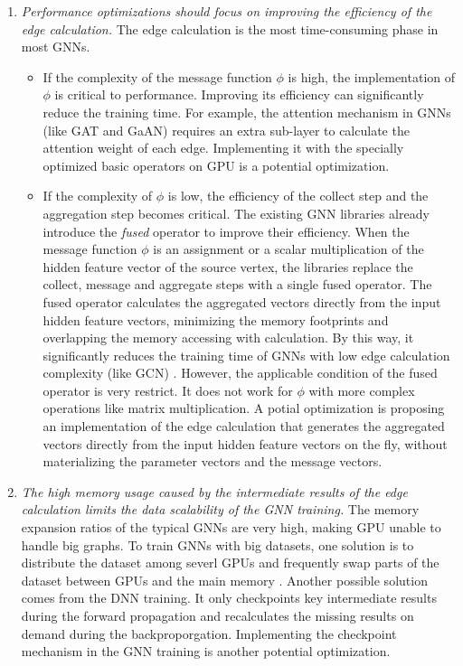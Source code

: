 \begin{enumerate}
    \item \emph{Performance optimizations should focus on improving the efficiency of the edge calculation.}
          The edge calculation is the most time-consuming phase in most GNNs.
          \begin{itemize}
              \item If the complexity of the message function $\phi$ is high, the implementation of $\phi$ is critical to performance.
                    Improving its efficiency can significantly reduce the training time.
                    For example, the attention mechanism in GNNs (like GAT and GaAN) requires an extra sub-layer to calculate the attention weight of each edge.
                    Implementing it with the specially optimized basic operators on GPU is a potential optimization.
              \item If the complexity of $\phi$ is low, the efficiency of the collect step and the aggregation step becomes critical.
                    The existing GNN libraries \cite{DGL, PyG, ma2019_neugraph} already introduce the \emph{fused} operator to improve their efficiency.
                    When the message function $\phi$ is an assignment or a scalar multiplication of the hidden feature vector of the source vertex, the libraries replace the collect, message and aggregate steps with a single fused operator.
                    The fused operator calculates the aggregated vectors directly from the input hidden feature vectors, minimizing the memory footprints and overlapping the memory accessing with calculation.
                    By this way, it significantly reduces the training time of GNNs with low edge calculation complexity (like GCN) \cite{yan2020_characterizing_gcn, zhang2020_analysis_neugraph}.
                    However, the applicable condition of the fused operator is very restrict.
                    It does not work for $\phi$ with more complex operations like matrix multiplication.
                    A potial optimization is proposing an implementation of the edge calculation that generates the aggregated vectors directly from the input hidden feature vectors on the fly, without materializing the parameter vectors and the message vectors.
          \end{itemize}
    \item \emph{The high memory usage caused by the intermediate results of the edge calculation limits the data scalability of the GNN training.}
          The memory expansion ratios of the typical GNNs are very high, making GPU unable to handle big graphs.
          To train GNNs with big datasets, one solution is to distribute the dataset among severl GPUs and frequently swap parts of the dataset between GPUs and the main memory \cite{ma2019_neugraph}.
          Another possible solution \cite{chen2016_training_deep} comes from the DNN training.
          It only checkpoints key intermediate results during the forward propagation and recalculates the missing results on demand during the backproporgation.
          Implementing the checkpoint mechanism in the GNN training is another potential optimization.


\end{enumerate}
